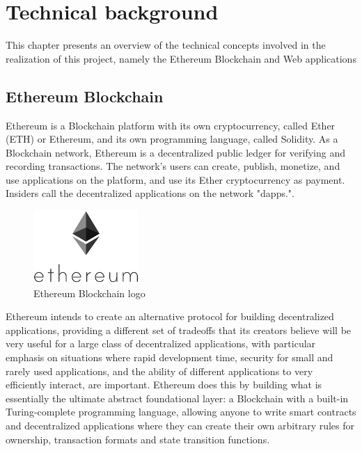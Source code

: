 \chapter{Technical background}
This chapter presents an overview of the technical concepts involved in the realization of this project, namely the Ethereum Blockchain and Web applications

\section{Ethereum Blockchain}
Ethereum is a Blockchain platform with its own \gls{cryptocurrency}, called Ether (ETH) or Ethereum, and its own programming language, called Solidity. As a Blockchain network, Ethereum is a decentralized public ledger for verifying and recording transactions. The network's users can create, publish, monetize, and use applications on the platform, and use its Ether cryptocurrency as payment. Insiders call the decentralized applications on the network "dapps."\cite{ethereumcommunityEthereumDevelopmentDocumentation}.

\begin{figure}
	\vspace{-10pt}
	\includegraphics[width=4cm]{images/chapter2/ethereum.png}
	\vspace{-10pt}
	\caption{{\footnotesize Ethereum Blockchain logo}}
\end{figure}

Ethereum intends to create an alternative protocol for building decentralized applications, providing a different set of tradeoffs that its creators believe will be very useful for a large class of decentralized applications, with particular emphasis on situations where rapid development time, security for small and rarely used applications, and the ability of different applications to very efficiently interact, are important. Ethereum does this by building what is essentially the ultimate abstract foundational layer: a Blockchain with a built-in Turing-complete programming language, allowing anyone to write smart contracts and decentralized applications where they can create their own arbitrary rules for ownership, transaction formats and state transition functions.\cite{buterinvitalikEthereumWhitePaper2013}

